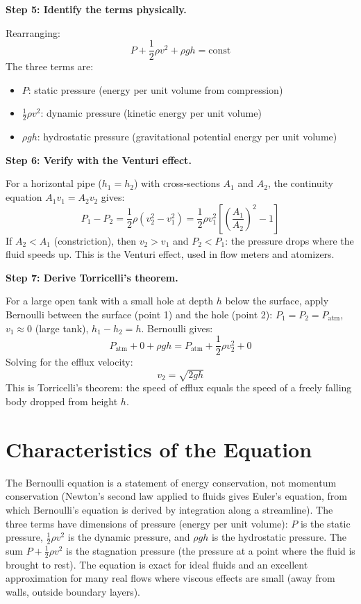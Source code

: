 \textbf{Step 5: Identify the terms physically.}

Rearranging:
\begin{equation}
P + \frac{1}{2}\rho v^2 + \rho gh = \text{const}
\end{equation}
The three terms are:
\begin{itemize}
\item $P$: static pressure (energy per unit volume from compression)
\item $\frac{1}{2}\rho v^2$: dynamic pressure (kinetic energy per unit volume)
\item $\rho gh$: hydrostatic pressure (gravitational potential energy per unit volume)
\end{itemize}

\textbf{Step 6: Verify with the Venturi effect.}

For a horizontal pipe ($h_1 = h_2$) with cross-sections $A_1$ and $A_2$, the continuity equation $A_1 v_1 = A_2 v_2$ gives:
\begin{equation}
P_1 - P_2 = \frac{1}{2}\rho(v_2^2 - v_1^2) = \frac{1}{2}\rho v_1^2\left[\left(\frac{A_1}{A_2}\right)^2 - 1\right]
\end{equation}
If $A_2 < A_1$ (constriction), then $v_2 > v_1$ and $P_2 < P_1$: the pressure drops where the fluid speeds up. This is the Venturi effect, used in flow meters and atomizers.

\textbf{Step 7: Derive Torricelli's theorem.}

For a large open tank with a small hole at depth $h$ below the surface, apply Bernoulli between the surface (point 1) and the hole (point 2): $P_1 = P_2 = P_{\text{atm}}$, $v_1 \approx 0$ (large tank), $h_1 - h_2 = h$. Bernoulli gives:
\begin{equation}
P_{\text{atm}} + 0 + \rho gh = P_{\text{atm}} + \frac{1}{2}\rho v_2^2 + 0
\end{equation}
Solving for the efflux velocity:
\begin{equation}
v_2 = \sqrt{2gh}
\end{equation}
This is Torricelli's theorem: the speed of efflux equals the speed of a freely falling body dropped from height $h$.

\section*{Characteristics of the Equation}

The Bernoulli equation is a statement of energy conservation, not momentum conservation (Newton's second law applied to fluids gives Euler's equation, from which Bernoulli's equation is derived by integration along a streamline). The three terms have dimensions of pressure (energy per unit volume): $P$ is the static pressure, $\frac{1}{2}\rho v^2$ is the dynamic pressure, and $\rho gh$ is the hydrostatic pressure. The sum $P + \frac{1}{2}\rho v^2$ is the stagnation pressure (the pressure at a point where the fluid is brought to rest). The equation is exact for ideal fluids and an excellent approximation for many real flows where viscous effects are small (away from walls, outside boundary layers).
